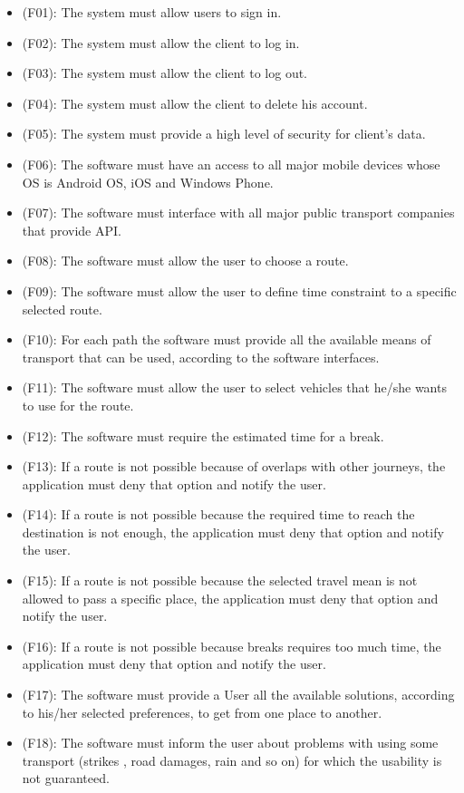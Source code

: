 \documentclass[a4paper,leqno]{book}
\begin{document}
\begin{itemize}
	
	\item (F01): The system must allow users to sign in.
	\item (F02): The system must allow the client to log in.
	\item (F03): The system must allow the client to log out.
	\item (F04): The system must allow the client to delete his account.
	\item (F05): The system must provide a high level of security for client's data.
	\item (F06): The software must have an access to all major mobile devices whose OS is Android OS, iOS and Windows Phone.
	\item (F07): The software must interface with all major public transport companies that provide API.
	\item (F08): The software must allow the user to choose a route.
	\item (F09): The software must allow the user to define time constraint to a specific selected route.
	\item (F10): For each path the software must provide all the available means of transport that can be used, according to the software interfaces.
	\item (F11): The software must allow the user to select vehicles that he/she wants to use for the route.
	\item (F12): The software must require the estimated time for a break.
	\item (F13): If a route is not possible because of overlaps with other journeys, the application must deny that option and notify the user.
	\item (F14): If a route is not possible because the required time to reach the destination is not enough, the application must deny that option and notify the user.
	\item (F15): If a route is not possible because the selected travel mean is not allowed to pass a specific place, the application must deny that option and notify the user.
	\item (F16): If a route is not possible because breaks requires too much time, the application must deny that option and notify the user.
	\item (F17): The software must provide a User all the available solutions, according to his/her selected preferences, to get from one place to another.
	\item (F18): The software must inform the user about problems with using some transport (strikes , road damages, rain and so on) for which the usability is not guaranteed.

\end{itemize}
\end{document}
